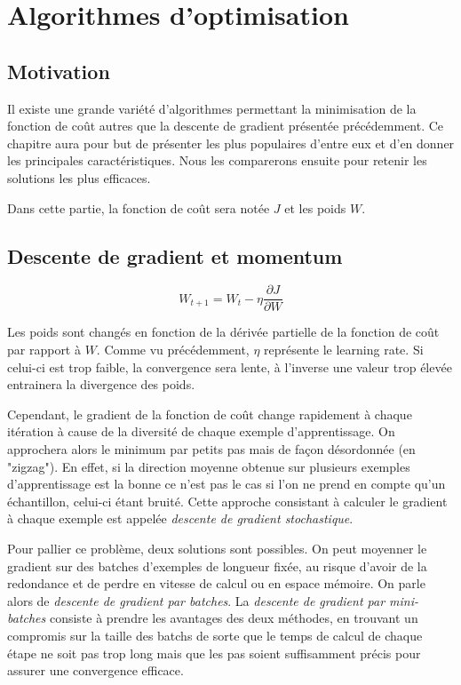 \chapter{Algorithmes d'optimisation}
\label{chap:Algorithmes d'optimisation}

\section{Motivation}
Il existe une grande variété d'algorithmes permettant la minimisation de la fonction de coût autres que la descente de gradient présentée précédemment. Ce chapitre aura pour but de présenter les plus populaires d'entre eux et d'en donner les principales caractéristiques. Nous les comparerons ensuite pour retenir les solutions les plus efficaces.

Dans cette partie, la fonction de coût sera notée $J$ et les poids $W$.

\section{Descente de gradient et momentum}
\begin{equation}
W_{t+1} = W_t - \eta\frac{\partial J}{\partial W}
\end{equation} 

Les poids sont changés en fonction de la dérivée partielle de la fonction de coût par rapport à $W$. Comme vu précédemment, $\eta$ représente le learning rate. Si celui-ci est trop faible, la convergence sera lente, à l'inverse une valeur trop élevée entrainera la divergence des poids.

Cependant, le gradient de la fonction de coût change rapidement à chaque itération à cause de la diversité de chaque exemple d'apprentissage. On approchera alors le minimum par petits pas mais de façon désordonnée (en "zigzag"). En effet, si la direction moyenne obtenue sur plusieurs exemples d'apprentissage est la bonne ce n'est pas le cas si l'on ne prend en compte qu'un échantillon, celui-ci étant bruité. Cette approche consistant à calculer le gradient à chaque exemple est appelée \textit{descente de gradient stochastique}.

Pour pallier ce problème, deux solutions sont possibles. On peut moyenner le gradient sur des batches d'exemples de longueur fixée, au risque d'avoir de la redondance et de perdre en vitesse de calcul ou en espace mémoire. On parle alors de \textit{descente de gradient par batches}. La \textit{descente de gradient par mini-batches} consiste à prendre les avantages des deux méthodes, en trouvant un compromis sur la taille des batchs de sorte que le temps de calcul de chaque étape ne soit pas trop long mais que les pas soient suffisamment précis pour assurer une convergence efficace.

